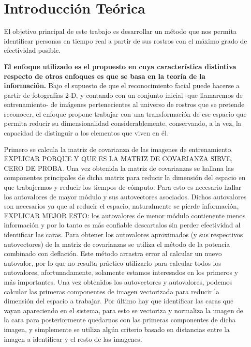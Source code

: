 \section{Introducción Teórica}
%
El objetivo principal de este trabajo es desarrollar un método que nos permita identificar personas en tiempo real a partir de sus rostros con el máximo grado de efectividad posible.
\newline
\par
\textbf{El enfoque utilizado es el propuesto en \cite{eigenfaces} cuya característica distintiva respecto de otros enfoques es que se basa en la teoría de la información.} Bajo el supuesto de que el reconocimiento facial puede hacerse a partir de fotografías 2-D, y contando con un conjunto inicial -que llamaremos de entrenamiento- de imágenes pertenecientes al universo de rostros que se pretende reconocer, el enfoque propone trabajar con una transformación de ese espacio que permita reducir su dimensionalidad considerablemente, conservando, a la vez, la capacidad de distinguir a los elementos que viven en él.
\newline
\par
Primero se calcula la matriz de covarianza de las imagenes de entrenamiento. EXPLICAR PORQUE Y QUE ES LA MATRIZ DE COVARIANZA SIRVE, CERO DE PROBA. Una vez obtenida la matriz de covarianzas se hallana las componentes principales de dicha matriz para reducir la dimensión del espacio en que trabajermos y reducir los tiempos de cómputo. Para esto es necesario hallar los autovalores de mayor módulo y sus autovectores asociados. Dichos autovalores son necesarios ya que al reducir el espacio, naturalmente se pierde información, EXPLICAR MEJOR ESTO: los autovalores de menor módulo contienente menos información y por lo tanto es más confiable descartalos sin perder efectividad al identificar las caras.
\newline
Para obtener los autovalores aproximados (y sus respectivos autovectores) de la matriz de covarianzas se utiliza el método de la potencia combinado con deflación. Este método arrastra error al calcular un nuevo autovalor, por lo que no resulta práctico utilizarlo para calcular todos los autovalores, afortunadamente, solamente estamos interesados en los primeros y más importantes.
Una vez obtenidos los autovectores y autovalores, podemos calcular las primeras componentes de imagen vectorizada para reducir la dimensión del espacio a trabajar.
\newline
Por último hay que identificar las caras que vayan apareciendo en el sistema, para esto se vectoriza y normaliza la imagen de la cara para posteriormente quedarnos con las primeras componentes de dicha imagen, y simplemente se utiliza algún criterio basado en  distancias entre la imagen a identificar y el resto de las imagenes.

